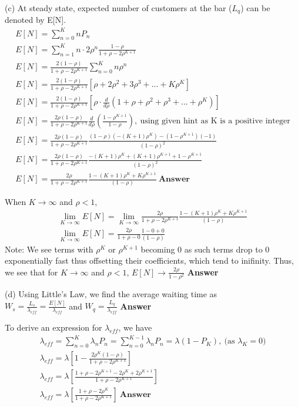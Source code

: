 (c) At steady state, expected number of customers at the bar ($L_q$) can be denoted by E[N].
\begin{gather*}
E[N] = \sum_{n=0}^{K}nP_n\\
E[N] = \sum_{n=1}^{K}n\cdot2\rho^n\frac{1-\rho}{1+\rho - 2\rho^{K+1}}\\
E[N] = \frac{2(1-\rho)}{1+\rho - 2\rho^{K+1}}\sum_{n=0}^{K}n\rho^n\\
E[N] = \frac{2(1-\rho)}{1+\rho - 2\rho^{K+1}}[\rho + 2\rho^2 + 3\rho^3 + ... + K\rho^K]\\
E[N] = \frac{2(1-\rho)}{1+\rho - 2\rho^{K+1}}[\rho \cdot \frac{d}{d\rho} (1 + \rho + \rho^2 + \rho^3 + ... + \rho^K)]\\
E[N] = \frac{2\rho(1-\rho)}{1+\rho - 2\rho^{K+1}}\frac{d}{d\rho} (\frac{1 - \rho^{K+1}}{1 - \rho}), \ \text{using given hint as K is a positive integer} \\
E[N] = \frac{2\rho(1-\rho)}{1+\rho - 2\rho^{K+1}}\frac{(1-\rho)(-(K+1)\rho^K) - (1 - \rho^{K+1})(-1)}{(1-\rho)^2}\\
E[N] = \frac{2\rho(1-\rho)}{1+\rho - 2\rho^{K+1}}\frac{-(K+1)\rho^K + (K+1)\rho^{K+1}+1 - \rho^{K+1}}{(1-\rho)^2}\\
E[N] = \frac{2\rho}{1+\rho - 2\rho^{K+1}}\frac{1 - (K+1)\rho^K + K\rho^{K+1}}{(1-\rho)}\ \textbf{Answer}
\end{gather*}

When $K\to\infty$ and $\rho < 1$,
\begin{gather*}
\lim_{K\to\infty}E[N] = \lim_{K\to\infty} \frac{2\rho}{1+\rho - 2\rho^{K+1}}\frac{1 - (K+1)\rho^K + K\rho^{K+1}}{(1-\rho)}\\
\lim_{K\to\infty}E[N] = \frac{2\rho}{1+\rho - 0}\frac{1 - 0 + 0}{(1-\rho)}
\end{gather*}
Note: We see terms with $\rho^{K}$ or $\rho^{K+1}$ becoming 0 as such terms drop to 0 exponentially fast thus offsetting their coefficients, which tend to inifinity. Thus, we see that for $K\to\infty$ and $\rho<1$, $E[N]\to\frac{2\rho}{1-\rho^2}$ \textbf{Answer}

(d) Using Little's Law, we find the average waiting time as \\
$W_s = \frac{L_s}{\lambda_{eff}} = \frac{E[N]}{\lambda_{eff}}$ and $W_q = \frac{L_q}{\lambda_{eff}}$  \textbf{Answer}

To derive an expression for $\lambda_{eff}$, we have
\begin{gather*}
\lambda_{eff} = \sum_{n=0}^{K}\lambda_n P_n = \sum_{n=0}^{K-1}\lambda_n P_n = \lambda(1-P_K),\ \text{(as $\lambda_K = 0)$}\\
\lambda_{eff} = \lambda \left[1 - \frac{2\rho^K(1-\rho)}{1 + \rho - 2\rho^{K+1}} \right]\\
\lambda_{eff} = \lambda \left[\frac{1 + \rho - 2\rho^{K+1} - 2\rho^K +2\rho^{K+1}}{1 + \rho - 2\rho^{K+1}} \right]\\
\lambda_{eff} = \lambda \left[\frac{1 + \rho - 2\rho^K}{1 + \rho - 2\rho^{K+1}} \right] \ \textbf{Answer}
\end{gather*}

